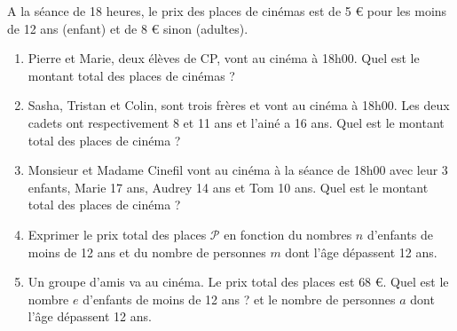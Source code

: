 
A la séance de 18 heures, le prix des places de cinémas est de 5 \euro{} pour les moins de 12 ans (enfant) et de 8 \euro{} sinon (adultes).

\begin{enumerate}[leftmargin=*]
\item Pierre et Marie, deux élèves de CP, vont au cinéma à 18h00. Quel est le montant total des places de cinémas ? 
\item Sasha, Tristan et Colin, sont trois frères et  vont au cinéma à 18h00. Les deux cadets ont respectivement 8 et 11 ans et l'ainé a 16 ans. Quel est le montant total des places de cinéma ? 
\item Monsieur et Madame Cinefil vont au cinéma à la séance de 18h00 avec leur 3 enfants, Marie 17 ans, Audrey 14 ans et Tom 10 ans. Quel est le montant total des places de cinéma ? 
\item Exprimer le prix total des places $\mathcal{P}$ en fonction du nombres $n$ d'enfants de moins de 12 ans et du nombre de personnes $m$ dont l'âge dépassent 12 ans. 
\item Un groupe d'amis va au cinéma. Le prix total des places est $68$ \euro{}. Quel est le nombre $e$ d'enfants de moins de 12 ans ?  et le nombre de personnes $a$ dont l'âge dépassent 12 ans. 
\end{enumerate}